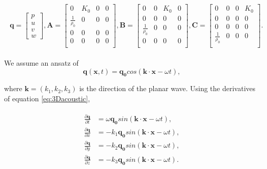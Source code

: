 \begin{align}
    \begin{split}
        \mathbf{q} = \begin{bmatrix}
            p \\
            u \\
            v \\
            w 
        \end{bmatrix},
        \mathbf{A} = \begin{bmatrix}
            0 & K_0 & 0 & 0 \\
            \frac{1}{\rho_0} & 0 & 0 & 0 \\
            0 & 0 & 0 & 0 \\
            0 & 0 & 0 & 0 \\
        \end{bmatrix},
        \mathbf{B} = \begin{bmatrix}
            0 & 0 & K_0 & 0 \\
            0 & 0 & 0 & 0 \\
            \frac{1}{\rho_0} & 0 & 0 & 0 \\
            0 & 0 & 0 & 0 \\
        \end{bmatrix},
        \mathbf{C} = \begin{bmatrix}
            0 & 0 & 0 & K_0 \\
            0 & 0 & 0 & 0 \\
            0 & 0 & 0 & 0 \\
            \frac{1}{\rho_0} & 0 & 0 & 0 \\
        \end{bmatrix}.
    \end{split}
\end{align}

We assume an ansatz of 
\begin{equation}
    \mathbf{q}\left(\mathbf{x}, t\right) = \mathbf{q_0} cos\left(\mathbf{k}\cdot\mathbf{x} - \omega t\right),
\end{equation}

where $\mathbf{k}=\left(k_1, k_2, k_3\right)$ is the direction of the planar wave. Using the derivatives of equation \ref{eq:3Dacoustic},

\begin{align}
    \begin{split}
    \frac{\partial \mathbf{q}}{\partial t} &= \omega \mathbf{q_0} sin\left(\mathbf{k}\cdot\mathbf{x} - \omega t\right), \\
    \frac{\partial \mathbf{q}}{\partial x} &= -k_1 \mathbf{q_0} sin\left(\mathbf{k}\cdot\mathbf{x} - \omega t\right), \\
    \frac{\partial \mathbf{q}}{\partial y} &= -k_2 \mathbf{q_0} sin\left(\mathbf{k}\cdot\mathbf{x} - \omega t\right), \\
    \frac{\partial \mathbf{q}}{\partial z} &= -k_3 \mathbf{q_0} sin\left(\mathbf{k}\cdot\mathbf{x} - \omega t\right).
\end{split}
\end{align}

